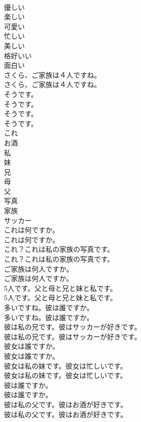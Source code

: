 \documentclass[8pt]{extreport}
\begin{document}
\begin{CJK}{UTF8}{min}
\\	優しい
\\	楽しい
\\	可愛い
\\	忙しい
\\	美しい
\\	格好いい
\\	面白い
\\	さくら、ご家族は４人ですね。	
\\	さくら、ご家族は４人ですね。 
\\	そうです。	
\\	そうです。 
\\	そうです。	
\\	そうです。 
\\	これ
\\	お酒
\\	私
\\	妹
\\	兄
\\	母
\\	父
\\	写真
\\	家族
\\	サッカー
\\	これは何ですか。	
\\	これは何ですか。 
\\	これ？これは私の家族の写真です。	
\\	これ？これは私の家族の写真です。 
\\	ご家族は何人ですか。	
\\	ご家族は何人ですか。 
\\	5人です。父と母と兄と妹と私です。	
\\	5人です。父と母と兄と妹と私です。 
\\	多いですね。彼は誰ですか。	
\\	多いですね。彼は誰ですか。 
\\	彼は私の兄です。彼はサッカーが好きです。	
\\	彼は私の兄です。彼はサッカーが好きです。 
\\	彼女は誰ですか。	
\\	彼女は誰ですか。 
\\	彼女は私の妹です。彼女は忙しいです。	
\\	彼女は私の妹です。彼女は忙しいです。 
\\	彼は誰ですか。	
\\	彼は誰ですか。 
\\	彼は私の父です。彼はお酒が好きです。	
\\	彼は私の父です。彼はお酒が好きです。 

\end{CJK}
\end{document}

